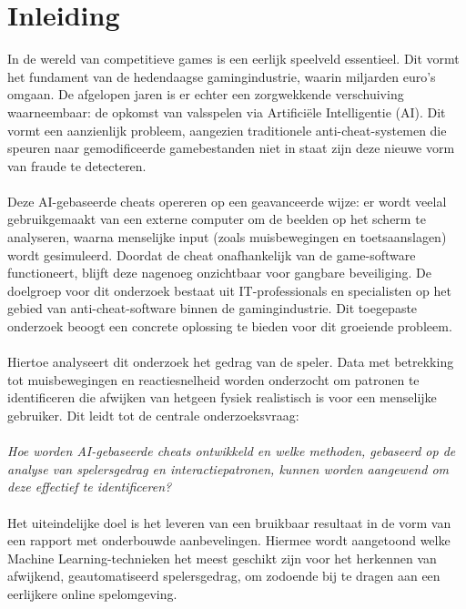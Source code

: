 
\section{Inleiding}%
\label{sec:inleiding}

In de wereld van competitieve games is een eerlijk speelveld essentieel. Dit vormt het fundament van de hedendaagse gamingindustrie, waarin miljarden euro’s omgaan. De afgelopen jaren is er echter een zorgwekkende verschuiving waarneembaar: de opkomst van valsspelen via Artificiële Intelligentie (AI). Dit vormt een aanzienlijk probleem, aangezien traditionele anti-cheat-systemen die speuren naar gemodificeerde gamebestanden niet in staat zijn deze nieuwe vorm van fraude te detecteren.
\\\\
Deze AI-gebaseerde cheats opereren op een geavanceerde wijze: er wordt veelal gebruikgemaakt van een externe computer om de beelden op het scherm te analyseren, waarna menselijke input (zoals muisbewegingen en toetsaanslagen) wordt gesimuleerd. Doordat de cheat onafhankelijk van de game-software functioneert, blijft deze nagenoeg onzichtbaar voor gangbare beveiliging. De doelgroep voor dit onderzoek bestaat uit IT-professionals en specialisten op het gebied van anti-cheat-software binnen de gamingindustrie. Dit toegepaste onderzoek beoogt een concrete oplossing te bieden voor dit groeiende probleem.
\\\\
Hiertoe analyseert dit onderzoek het gedrag van de speler. Data met betrekking tot muisbewegingen en reactiesnelheid worden onderzocht om patronen te identificeren die afwijken van hetgeen fysiek realistisch is voor een menselijke gebruiker. Dit leidt tot de centrale onderzoeksvraag:
\\\\
\textit{Hoe worden AI-gebaseerde cheats ontwikkeld en welke methoden, gebaseerd op de analyse van spelersgedrag en interactiepatronen, kunnen worden aangewend om deze effectief te identificeren?}
\\\\
Het uiteindelijke doel is het leveren van een bruikbaar resultaat in de vorm van een rapport met onderbouwde aanbevelingen. Hiermee wordt aangetoond welke Machine Learning-technieken het meest geschikt zijn voor het herkennen van afwijkend, geautomatiseerd spelersgedrag, om zodoende bij te dragen aan een eerlijkere online spelomgeving.


